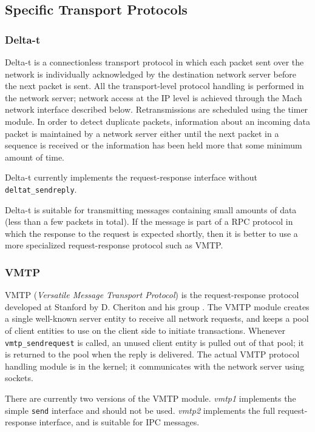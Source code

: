 \subsection{Specific Transport Protocols}
\subsubsection{Delta-t}
Delta-t is a connectionless transport protocol in which each packet
sent over the network is individually acknowledged by the destination
network server before the next packet is sent. All the transport-level
protocol handling is performed in the network server; network access
at the IP level is achieved through the Mach network interface
described below.  Retransmissions are scheduled using the timer
module.  In order to detect duplicate packets, information about an
incoming data packet is maintained by a network server either until
the next packet in a sequence is received or the information has been
held more that some minimum amount of time.

Delta-t currently implements the request-response interface without
\verb"deltat_sendreply". 

Delta-t is suitable for transmitting messages containing small amounts of
data (less than a few packets in total).  If the message is part of a RPC
protocol in which the response to the request is expected shortly, then it
is better to use a more specialized request-response protocol such as VMTP.

\subsubsection{VMTP}
VMTP ({\it Versatile Message Transport Protocol}) is the
request-response protocol developed at Stanford by D. Cheriton and his
group \cite{VMTP}. The VMTP module creates a single well-known server
entity to receive all network requests, and keeps a pool of client
entities to use on the client side to initiate transactions. Whenever
\verb"vmtp_sendrequest" is called, an unused client entity is pulled out of
that pool; it is returned to the pool when the reply is delivered. The
actual VMTP protocol handling module is in the kernel; it communicates
with the network server using sockets.

There are currently two versions of the VMTP module. {\it vmtp1}
implements the simple \verb"send" interface and should not be used.
{\it vmtp2} implements the full request-response interface, and is
suitable for IPC messages.

